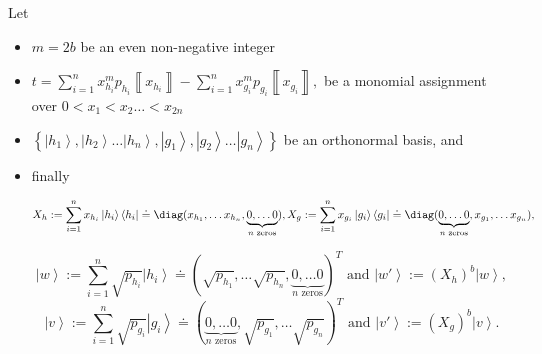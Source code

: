 \documentclass{theoretics}
\begin{document}
\begin{proposition}
  \label{prop:ExactSolnBalancedMonomialAligned}Let
  \begin{itemize}
    \item $m=2b$ be an even non-negative integer
    \item $
            t=\sum_{i=1}^{n}x_{h_{i}}^{m}p_{h_{i}}\left\llbracket x_{h_{i}}\right\rrbracket -\sum_{i=1}^{n}x_{g_{i}}^{m}p_{g_{i}}\left\llbracket x_{g_{i}}\right\rrbracket ,
          $ be a monomial assignment over $0<x_{1}<x_{2}\dots<x_{2n}$
    \item $\left\{ \left|h_{1}\right\rangle ,\left|h_{2}\right\rangle \dots\left|h_{n}\right\rangle ,\left|g_{1}\right\rangle ,\left|g_{2}\right\rangle \dots\left|g_{n}\right\rangle \right\} $
          be an orthonormal basis, and
    \item finally
          \begin{footnotesize}
            \begin{displaymath}
              X_{h}:=\sum_{i=1}^{n}x_{h_{i}}\left|h_{i}\right\rangle \left\langle h_{i}\right|\doteq\diag(x_{h_{1}},\dots x_{h_{n}},\underbrace{0,\dots0}_{n\text{ zeros}}),
              X_{g}:=\sum_{i=1}^{n}x_{g_{i}}\left|g_{i}\right\rangle \left\langle g_{i}\right|\doteq\diag(\underbrace{0,\dots0}_{n\text{ zeros}},x_{g_{1}},\dots x_{g_{n}}),
            \end{displaymath}
          \end{footnotesize}
          \begin{displaymath}
            \left|w\right\rangle :=\sum_{i=1}^{n}\sqrt{p_{h_{i}}}\left|h_{i}\right\rangle \doteq(\sqrt{p_{h_{1}}},\dots\sqrt{p_{h_{n}}},\underbrace{0,\dots0}_{n\text{ zeros}})^{T} \text{ and } \left|w'\right\rangle :=(X_{h})^{b}\left|w\right\rangle,
          \end{displaymath}
          \begin{displaymath}
            \left|v\right\rangle :=\sum_{i=1}^{n}\sqrt{p_{g_{i}}}\left|g_{i}\right\rangle \doteq(\underbrace{0,\dots0}_{n\text{ zeros}},\sqrt{p_{g_{1}}},\dots\sqrt{p_{g_{n}}})^{T} \text{ and }\left|v'\right\rangle :=(X_{g})^{b}\left|v\right\rangle.
          \end{displaymath}


\end{itemize}
\end{proposition}
\end{document}
